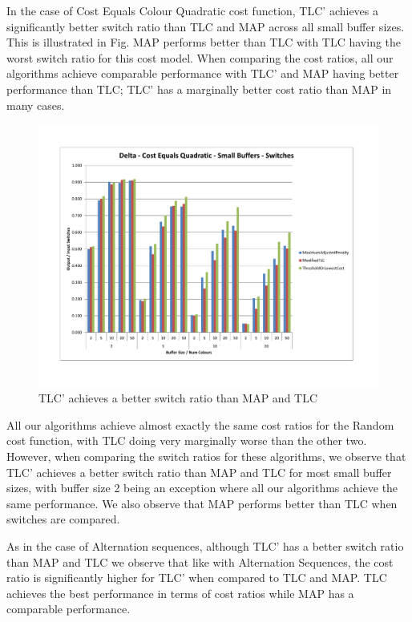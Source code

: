 In the case of Cost Equals Colour Quadratic cost function, TLC' achieves a significantly better switch ratio than TLC and MAP across all small buffer sizes. This is illustrated in Fig. MAP performs better than TLC with TLC having the worst switch ratio for this cost model. When comparing the cost ratios, all our algorithms achieve comparable performance with TLC' and MAP having better performance than TLC; TLC' has a marginally better cost ratio than MAP in many cases. 

\begin{figure}[ht]
\centering 
\includegraphics[scale=0.60]{Delta-cq-small-switches.pdf}
\caption{TLC' achieves a better switch ratio than MAP and TLC}
\label{deltaCQSmallSwitches}
\end{figure}   

All our algorithms achieve almost exactly the same cost ratios for the Random cost function, with TLC doing very marginally worse than the other two. However, when comparing the switch ratios for these algorithms, we observe that TLC' achieves a better switch ratio than MAP and TLC for most small buffer sizes, with buffer size 2 being an exception where all our algorithms achieve the same performance. We also observe that MAP performs better than TLC when switches are compared. 

As in the case of Alternation sequences, although TLC' has a better switch ratio than MAP and TLC we observe that like with Alternation Sequences, the cost ratio is significantly higher for TLC' when compared to TLC and MAP. TLC achieves the best performance in terms of cost ratios while MAP has a comparable performance. 

